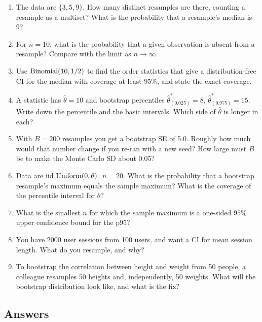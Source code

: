 \begin{enumerate}
  \item The data are $\{3, 5, 9\}$. How many distinct resamples are there,
  counting a resample as a multiset? What is the probability that a resample's
  median is 9?
  \item For $n = 10$, what is the probability that a given observation is
  absent from a resample? Compare with the limit as $n \to \infty$.
  \item Use $\operatorname{Binomial}(10, 1/2)$ to find the order statistics that give a
  distribution-free CI for the median with coverage at least $95\%$, and state
  the exact coverage.
  \item A statistic has $\hat\theta = 10$ and bootstrap percentiles
  $\hat\theta^*_{(0.025)} = 8$, $\hat\theta^*_{(0.975)} = 15$. Write down the
  percentile and the basic intervals. Which side of $\hat\theta$ is longer in
  each?
  \item With $B = 200$ resamples you get a bootstrap SE of 5.0. Roughly how
  much would that number change if you re-ran with a new seed? How large must
  $B$ be to make the Monte Carlo SD about $0.05$?
  \item Data are iid $\operatorname{Uniform}(0, \theta)$, $n = 20$. What is the probability that
  a bootstrap resample's maximum equals the sample maximum? What is the coverage
  of the percentile interval for $\theta$?
  \item What is the smallest $n$ for which the sample maximum is a one-sided
  $95\%$ upper confidence bound for the p95?
  \item You have 2000 user sessions from 100 users, and want a CI for mean
  session length. What do you resample, and why?
  \item To bootstrap the correlation between height and weight from 50 people,
  a colleague resamples 50 heights and, independently, 50 weights. What will
  the bootstrap distribution look like, and what is the fix?
\end{enumerate}

\subsection*{Answers}

